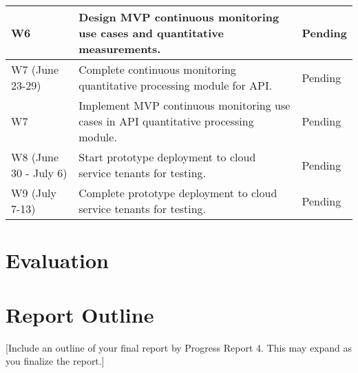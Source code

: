 \documentclass{jdf}
\begin{document}
\begin{xltabular}{\textwidth}{|l|X|l|}
    \hline
    W6 & Design MVP continuous monitoring use cases and quantitative measurements. & Pending \\
    \hline
    W7 (June 23-29) & Complete continuous monitoring quantitative processing module for API. & Pending \\
    \hline
    W7 & Implement MVP continuous monitoring use cases in API quantitative processing module. & Pending \\
    \hline    
    W8 (June 30 - July 6) & Start prototype deployment to cloud service tenants for testing. & Pending \\
    \hline
    W9 (July 7-13) & Complete prototype deployment to cloud service tenants for testing. & Pending \\
    \hline
\end{xltabular}

\section*{Evaluation}



\section*{Report Outline}

[Include an outline of your final report by Progress Report 4. This may expand as you finalize the report.]

\nocite{*}



\section*{}


\end{document}
